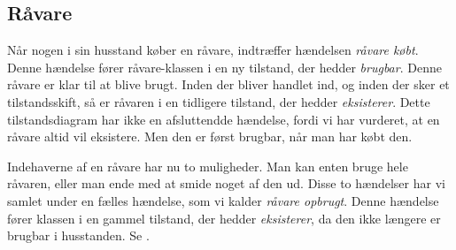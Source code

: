 \subsection{Råvare}
Når nogen i sin husstand køber en råvare, indtræffer hændelsen \textit{råvare købt}. Denne hændelse fører råvare-klassen i en ny tilstand, der hedder \textit{brugbar}. Denne råvare er klar til at blive brugt. Inden der bliver handlet ind, og inden der sker et tilstandsskift, så er råvaren i en tidligere tilstand, der hedder \textit{eksisterer}. Dette tilstandsdiagram har ikke en afsluttendde hændelse, fordi vi har vurderet, at en råvare altid vil eksistere. Men den er først brugbar, når man har købt den. 

Indehaverne af en råvare har nu to muligheder. Man kan enten bruge hele råvaren, eller man ende med at smide noget af den ud. Disse to hændelser har vi samlet under en fælles hændelse, som vi kalder \textit{råvare opbrugt}. Denne hændelse fører klassen i en gammel tilstand, der hedder \textit{eksisterer}, da den ikke længere er brugbar i husstanden. Se .

\begin{figure}[H]
	\centering
	\scalebox{0.8}{
	}
	\label{fig:raavare-adfaerd}
\end{figure}